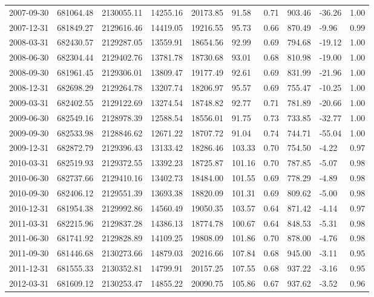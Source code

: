 \begin{landscape}
\begin{longtable}{llllllllll}
2007-09-30 & 681064.48 & 2130055.11 & 14255.16 & 20173.85 & 91.58  & 0.71 & 903.46  & -36.26 & 1.00 \\
2007-12-31 & 681849.27 & 2129616.46 & 14419.05 & 19216.55 & 95.73  & 0.66 & 870.49  & -9.96  & 0.99 \\
2008-03-31 & 682430.57 & 2129287.05 & 13559.91 & 18654.56 & 92.99  & 0.69 & 794.68  & -19.12 & 1.00 \\
2008-06-30 & 682304.44 & 2129402.76 & 13781.78 & 18730.68 & 93.01  & 0.68 & 810.98  & -19.00 & 1.00 \\
2008-09-30 & 681961.45 & 2129306.01 & 13809.47 & 19177.49 & 92.61  & 0.69 & 831.99  & -21.96 & 1.00 \\
2008-12-31 & 682698.29 & 2129264.78 & 13207.74 & 18206.97 & 95.57  & 0.69 & 755.47  & -10.25 & 1.00 \\
2009-03-31 & 682402.55 & 2129122.69 & 13274.54 & 18748.82 & 92.77  & 0.71 & 781.89  & -20.66 & 1.00 \\
2009-06-30 & 682549.16 & 2128978.39 & 12588.54 & 18556.01 & 91.75  & 0.73 & 733.85  & -32.77 & 1.00 \\
2009-09-30 & 682533.98 & 2128846.62 & 12671.22 & 18707.72 & 91.04  & 0.74 & 744.71  & -55.04 & 1.00 \\
2009-12-31 & 682872.79 & 2129396.43 & 13133.42 & 18286.46 & 103.33 & 0.70 & 754.50  & -4.22  & 0.97 \\
2010-03-31 & 682519.93 & 2129372.55 & 13392.23 & 18725.87 & 101.16 & 0.70 & 787.85  & -5.07  & 0.98 \\
2010-06-30 & 682737.66 & 2129410.16 & 13402.73 & 18484.00 & 101.55 & 0.69 & 778.29  & -4.89  & 0.98 \\
2010-09-30 & 682406.12 & 2129551.39 & 13693.38 & 18820.09 & 101.31 & 0.69 & 809.62  & -5.00  & 0.98 \\
2010-12-31 & 681954.38 & 2129992.86 & 14560.49 & 19050.35 & 103.57 & 0.64 & 871.42  & -4.14  & 0.97 \\
2011-03-31 & 682215.96 & 2129837.28 & 14386.13 & 18774.78 & 100.67 & 0.64 & 848.53  & -5.31  & 0.98 \\
2011-06-30 & 681741.92 & 2129828.89 & 14109.25 & 19808.09 & 101.86 & 0.70 & 878.00  & -4.76  & 0.98 \\
2011-09-30 & 681446.68 & 2130273.66 & 14879.03 & 20216.66 & 107.84 & 0.68 & 945.00  & -3.11  & 0.95 \\
2011-12-31 & 681555.33 & 2130352.81 & 14799.91 & 20157.25 & 107.55 & 0.68 & 937.22  & -3.16  & 0.95 \\
2012-03-31 & 681609.12 & 2130253.47 & 14855.22 & 20090.75 & 105.86 & 0.67 & 937.62  & -3.52  & 0.96 \\

\end{longtable}
\end{landscape}
